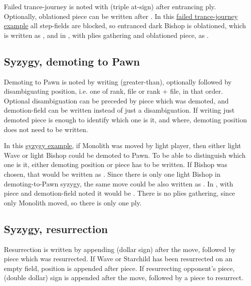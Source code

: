 Failed trance-journey is noted with  (triple at-sign) after entrancing ply.
Optionally, oblationed piece can be written after . In this
\hyperref[fig:scn_o_30_trance_journey_failed_2]{failed trance-journey example} all
step-fields are blocked, so entranced dark Bishop is oblationed, which is written as
, and in , with plies gathering and
oblationed piece, as .

\subsection*{Syzygy, demoting to Pawn}
\label{sec:Appendix/Notation/Syzygy, demoting to Pawn}

Demoting to Pawn is noted by writing \alg{>} (greater-than), optionally followed by
disambiguating position, i.e. one of rank, file or rank + file, in that order. Optional
disambiguation can be preceded by piece which was demoted, and demotion-field can be
written instead of just a disambiguation. If writing just demoted piece is enough to
identify which one is it, and where, demoting position does not need to be written.

In this \hyperref[fig:scn_d_21_syzygy_2_stars_init]{syzygy example}, if Monolith was
moved by light player, then either light Wave or light Bishop could be demoted to Pawn.
To be able to distinguish which one is it, either demoting position or piece has to be
written. If Bishop was chosen, that would be written as . Since there is
only one light Bishop in demoting-to-Pawn syzygy, the same move could be also written
as . In , with piece and demotion-field noted it would be
. There is no plies gathering, since only Monolith moved, so there
is only one ply.

\subsection*{Syzygy, resurrection}
\label{sec:Appendix/Notation/Syzygy, resurrection}

Resurrection is written by appending \alg{\$} (dollar sign) after the move, followed by
piece which was resurrected. If Wave or Starchild has been resurrected on an empty field,
position is appended after piece. If resurrecting opponent's piece, \alg{\$\$} (double
dollar) sign is appended after the move, followed by a piece to resurrect.

